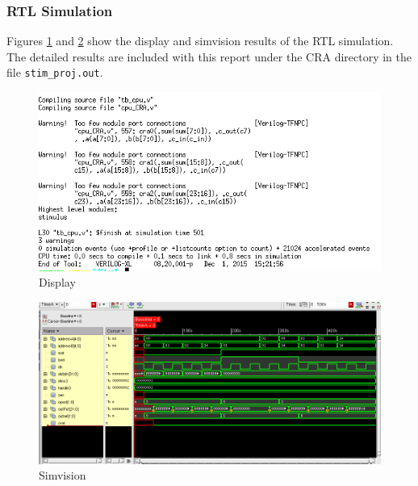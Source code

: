 \documentclass[12pt]{article}
\begin{document}
\subsubsection{RTL Simulation}
Figures \ref{fig:CRA-text} and \ref{fig:CRA-test} show the display and simvision results of the RTL simulation. The detailed results are included with this report under the CRA directory in the file \texttt{stim\_proj.out}.
\begin{figure}[H]
\centering
\includegraphics[width=.7\linewidth]{../CRA/CRA-text}
\caption{Display}
\label{fig:CRA-text}
\end{figure}
\begin{figure}[H]
\centering
\includegraphics[width=\linewidth]{../CRA/CRA-test}
\caption{Simvision}
\label{fig:CRA-test}
\end{figure}
\end{document}
